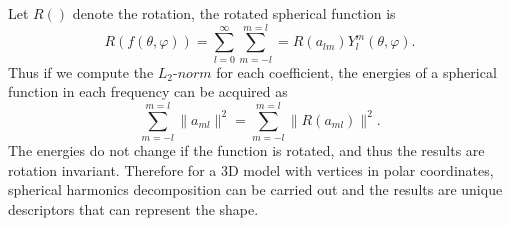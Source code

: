 \begin{enumerate}
Let $R()$ denote the rotation, the rotated spherical function is
\begin{equation} \label{rotatedfunction}
R(f(\theta,\varphi))=\sum_{l=0}^{\infty}\sum_{m=-l}^{m=l}=R(a_{lm})Y_{l}^{m}(\theta,\varphi).
\end{equation}
Thus if we compute the $L_{2}$-$norm$ for each coefficient, the energies of a spherical function in each frequency can be acquired as
\begin{equation} \label{l2norm}
\sum_{m=-l}^{m=l}\|a_{ml}\|^{2}=\sum_{m=-l}^{m=l}\|R(a_{ml})\|^{2}.
\end{equation}
The energies do not change if the function is rotated, and thus the results are rotation invariant. Therefore for a 3D model with vertices in polar coordinates, spherical harmonics decomposition can be carried out and the results are unique descriptors that can represent the shape. 
\end{enumerate}